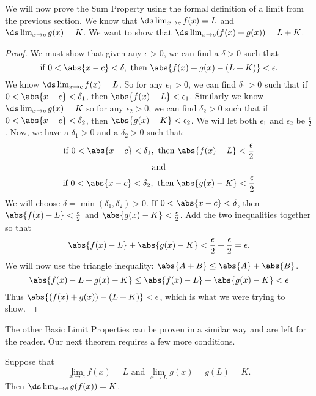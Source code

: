 We will now prove the Sum Property using the formal definition of a limit from the previous section. We know that $\ds \lim_{x\to c}f(x) = L$ and  $\ds\lim_{x\to c} g(x) = K$. We want to show that $\ds \lim_{x\to c}(f(x)+g(x))=L+K$.

\begin{proof}
We must show that given any $\epsilon>0$, we can find a $\delta>0$ such that
\[\text{if }0<\abs{x-c}<\delta,\text{ then }\abs{f(x)+g(x)-(L+K)}<\epsilon.\]
We know $\ds \lim_{x\to c}f(x) = L$. So for any $\epsilon_1 >0$, we can find $\delta_1>0$ such that if $0<\abs{x-c}<\delta_1$, then $\abs{f(x)-L}<\epsilon_1$. Similarly we know $\ds\lim_{x\to c} g(x) = K$ so for any $\epsilon_2>0$, we can find $\delta_2>0$ such that if  $0<\abs{x-c}<\delta_2$, then $\abs{g(x)-K}<\epsilon_2$. We will let both $\epsilon_1$ and $\epsilon_2$ be $\frac{\epsilon}{2}$. Now, we have a $\delta_1>0$ and a $\delta_2>0$ such that:
\begin{gather*}
\text{if }0<\abs{x-c}<\delta_1,\text{ then }\abs{f(x)-L}<\frac{\epsilon}{2} \\
\text{and} \\
\text{if }0<\abs{x-c}<\delta_2,\text{ then }\abs{g(x)-K}<\frac{\epsilon}{2}
\end{gather*}
We will choose $\delta=\min(\delta_1,\delta_2)>0$. If $0<\abs{x-c}<\delta$, then $\abs{f(x)-L}<\frac{\epsilon}{2}$ and  $\abs{g(x)-K}<\frac{\epsilon}{2}$.  Add the two inequalities together so that
\[\abs{f(x)-L}+\abs{g(x)-K}<\frac{\epsilon}{2}+\frac{\epsilon}{2}=\epsilon.\]
We will now use the triangle inequality: $\abs{A+B}\leq\abs{A}+\abs{B}$.
\[\abs{f(x)-L+g(x)-K}\leq\abs{f(x)-L}+\abs{g(x)-K}<\epsilon\]
Thus $\abs{(f(x)+g(x))-(L+K)}<\epsilon$, which is what we were trying to show.
\end{proof}

The other Basic Limit Properties can be proven in a similar way and are left for the reader.  Our next theorem requires a few more conditions.

\begin{theorem}\label{thm:limit_composition}
Suppose that\vspace{-.3\baselineskip}
\[\lim_{x\to c}f(x)=L\text{ and }\lim_{x\to L}g(x)=g(L)=K.\]
Then $\ds\lim_{x\to c}g(f(x))=K$.
\end{theorem}


